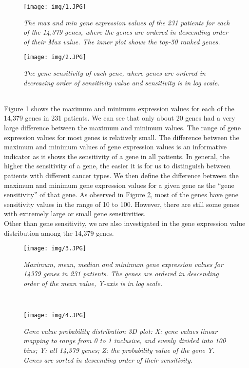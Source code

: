 \documentclass[12pt,a4paper]{report}
\begin{document}
\begin{figure}[h!]
\centering
\texttt{[image: img/1.JPG]}
\caption{\textit{The max and min gene expression values of the 231 patients for each of the 14,379 genes, where the genes are ordered in descending order of their Max value. The inner plot shows the top-50 ranked genes.}}
\label{fig:maxmin}
\end{figure}

\begin{figure}[h!]
\centering
\texttt{[image: img/2.JPG]}
\caption{\textit{The gene sensitivity of each gene, where genes are ordered in decreasing order of sensitivity value and sensitivity is in log scale. }}
\label{fig:sens}
\end{figure}\\

Figure \ref{fig:maxmin} shows the maximum and minimum expression values for each of the 14,379 genes in 231 patients. We can see that only about 20 genes had a very large difference between the maximum and minimum values. The range of gene expression values for most genes is relatively small. The difference between the maximum and minimum values of gene expression values is an informative indicator as it shows the sensitivity of a gene in all patients. In general, the higher the sensitivity of a gene, the easier it is for us to distinguish between patients with different cancer types. We then define the difference between the maximum and minimum gene expression values for a given gene as the ``gene sensitivity'' of that gene. As observed in Figure \ref{fig:sens}, most of the genes have gene sensitivity values in the range of 10 to 100. However, there are still some genes with extremely large or small gene sensitivities.\\

Other than gene sensitivity, we are also investigated in the gene expression value distribution among the 14,379 genes. \\

\begin{figure}[h!]
\centering
\texttt{[image: img/3.JPG]}
\caption{\textit{Maximum, mean, median and minimum gene expression values for 14379 genes in 231 patients.  The genes are ordered in descending order of the mean value, Y-axis is in log scale. }}
\label{fig:geneval_distr}
\end{figure}\\

\begin{figure}[h!]
\centering
\texttt{[image: img/4.JPG]}
\caption{\textit{Gene value probability distribution 3D plot: X: gene values linear mapping to range from 0 to 1 inclusive, and evenly divided into 100 bins; Y: all 14,379 genes; Z: the probability value of the gene Y. Genes are sorted in descending order of their sensitivity. }}
\label{fig:geneval_3d}
\end{figure}\\
\end{document}

